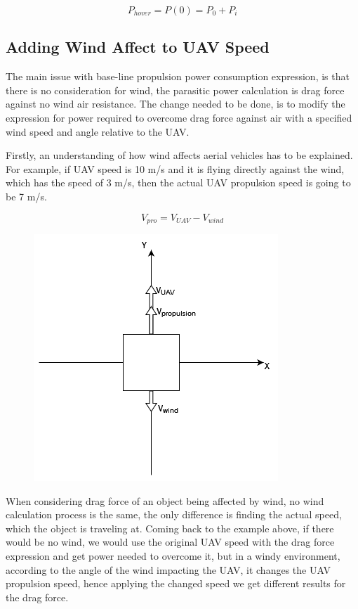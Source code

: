 \documentclass[11pt,a4paper,footinclude=true,headinclude=true, oneside]{scrbook}
\begin{document}
    \[ P_{hover} = P(0) = P_0 + P_i\]


\subsection{Adding Wind Affect to UAV Speed}

The main issue with base-line propulsion power consumption expression, is that there is no consideration for wind, the parasitic power calculation is drag force against no wind air resistance. The change needed to be done, is to modify the expression for power required to overcome drag force against air with a specified wind speed and angle relative to the UAV.

Firstly, an understanding of how wind affects aerial vehicles has to be explained. For example, if UAV speed is 10 m/s and it is flying directly against the wind, which has the speed of 3 m/s, then the actual UAV propulsion speed is going to be 7 m/s. 

 \[V_{pro} = V_{UAV} - V_{wind}\]

\begin{figure}[h]
\includegraphics[scale=0.7]{UAV_against_wind.png}
\centering
\end{figure}

When considering drag force of an object being affected by wind, no wind calculation process is the same, the only difference is finding the actual speed, which the object is traveling at. Coming back to the example above, if there would be no wind, we would use the original UAV speed with the drag force expression and get power needed to overcome it, but in a windy environment, according to the angle of the wind impacting the UAV, it changes the UAV propulsion speed, hence applying the changed speed we get different results for the drag force.
\end{document}
